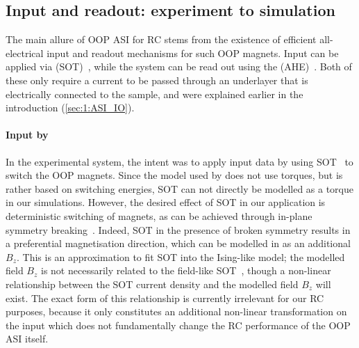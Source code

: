\subsection{Input and readout: experiment to simulation} \label{sec:3:IO_exp_to_sim}
The main allure of OOP ASI for RC stems from the existence of efficient all-electrical input and readout mechanisms for such OOP magnets.
Input can be applied via  (SOT)~\cite{SOT_FM_AFM,SOTswitchingCoPt}, while the system can be read out using the  (AHE)~\cite{AHE}.
Both of these only require a current to be passed through an underlayer that is electrically connected to the sample, and were explained earlier in the introduction (\cref{sec:1:ASI_IO}).

\paragraph{Input by }
In the experimental system, the intent was to apply input data by using SOT~\cite{SOTswitchingCoPt} to switch the OOP magnets.
Since the model used by \hotspice does not use torques, but is rather based on switching energies, SOT can not directly be modelled as a torque in our simulations.
However, the desired effect of SOT in our application is deterministic switching of magnets, as can be achieved through in-plane symmetry breaking~\cite{SOT_Roadmap}. %
Indeed, SOT in the presence of broken symmetry results in a preferential magnetisation direction, which can be modelled in \hotspice as an additional  $B_z$.
This is an approximation to fit SOT into the Ising-like model; the modelled field $B_z$ is not necessarily related to the field-like SOT~\cite{SOT_firstprinciplesCoPt}, though a non-linear relationship between the SOT current density and the modelled field $B_z$ will exist.
The exact form of this relationship is currently irrelevant for our RC purposes, because it only constitutes an additional non-linear transformation on the input which does not fundamentally change the RC performance of the OOP ASI itself.

